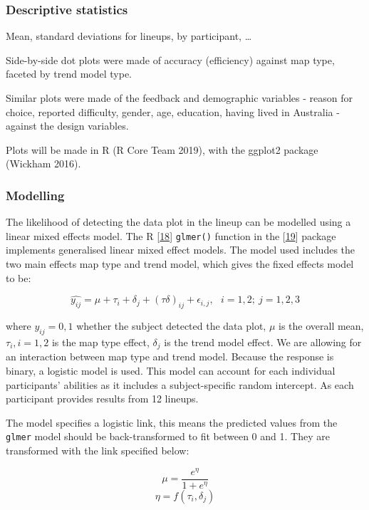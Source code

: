 \documentclass[conference,final,]{IEEEtran}
\begin{document}
\hypertarget{descriptive-statistics}{%
\subsubsection{Descriptive statistics}\label{descriptive-statistics}}

Mean, standard deviations for lineups, by participant, \ldots{}

Side-by-side dot plots were made of accuracy (efficiency) against map type, faceted by trend model type.

Similar plots were made of the feedback and demographic variables - reason for choice, reported difficulty, gender, age, education, having lived in Australia - against the design variables.

Plots will be made in R (R Core Team 2019), with the ggplot2 package (Wickham 2016).

\hypertarget{modelling}{%
\subsubsection{Modelling}\label{modelling}}

The likelihood of detecting the data plot in the lineup can be modelled using a linear mixed effects model.
The R {[}\protect\hyperlink{ref-RCore}{18}{]} \texttt{glmer()} function in the {[}\protect\hyperlink{ref-lme4}{19}{]} package implements generalised linear mixed effect models. The model used includes the two main effects map type and trend model, which gives the fixed effects model to be:

\[\widehat{y_{ij}} = \mu + \tau_i + \delta_j + (\tau\delta)_{ij} + \epsilon_{i,j}, ~~~ i=1,2; ~j=1,2,3\]

where \(y_{ij} = 0, 1\) whether the subject detected the data plot, \(\mu\) is the overall mean, \(\tau_i, i=1,2\) is the map type effect, \(\delta_j\) is the trend model effect. We are allowing for an interaction between map type and trend model. Because the response is binary, a logistic model is used. This model can account for each individual participants' abilities as it includes a subject-specific random intercept. As each participant provides results from 12 lineups.

The model specifies a logistic link, this means the predicted values from the \texttt{glmer} model should be back-transformed to fit between 0 and 1. They are transformed with the link specified below:

\[\mu = \frac{e^{\eta}}{1 + e^{\eta}}\] \label{eq:transform}
\[\eta = f(\tau_i,\delta_j)\]
\end{document}
